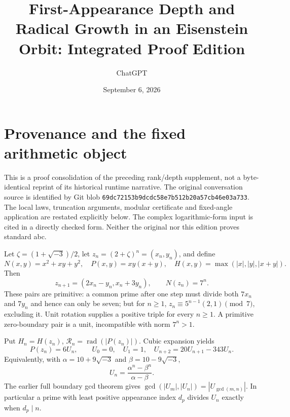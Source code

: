 \documentclass[11pt]{amsart}
\title{First-Appearance Depth and Radical Growth in an Eisenstein Orbit: Integrated Proof Edition}
\author{ChatGPT}\date{September 6, 2026}
\theoremstyle{definition}\newtheorem{definition}[theorem]{Definition}
\theoremstyle{remark}\newtheorem{remark}[theorem]{Remark}
\newcommand{\rad}{\operatorname{rad}}\newcommand{\eps}{\varepsilon}
\begin{document}
\maketitle
\section{Provenance and the fixed arithmetic object}
This is a proof consolidation of the preceding rank/depth supplement, not a byte-identical reprint of its historical runtime narrative. The original conversation source is identified by Git blob \texttt{69dc72153b9dcdc58e7b512b20a57cb46e03a733}. The local laws, truncation arguments, modular certificate and fixed-angle application are restated explicitly below. The complex logarithmic-form input is cited in a directly checked form. Neither the original nor this edition proves standard abc.

Let $\zeta=(1+\sqrt{-3})/2$, let $z_n=(2+\zeta)^n=(x_n,y_n)$, and define
\[
 N(x,y)=x^2+xy+y^2,\quad P(x,y)=xy(x+y),\quad H(x,y)=\max(|x|,|y|,|x+y|).
\]
Then
\[
 z_{n+1}=(2x_n-y_n,x_n+3y_n),\qquad N(z_n)=7^n.
\]
These pairs are primitive: a common prime after one step must divide both $7x_n$ and $7y_n$ and hence can only be seven; but for $n\ge1$, $z_n\equiv5^{n-1}(2,1)\pmod7$, excluding it. Unit rotation supplies a positive triple for every $n\ge1$. A primitive zero-boundary pair is a unit, incompatible with norm $7^n>1$.

Put $H_n=H(z_n)$, $\mathscr R_n=\rad(|P(z_n)|)$. Cubic expansion yields
\[
 P(z_n)=6U_n,\qquad U_0=0,\quad U_1=1,\quad U_{n+2}=20U_{n+1}-343U_n.
\]
Equivalently, with $\alpha=10+9\sqrt{-3}$ and $\beta=10-9\sqrt{-3}$,
\[
 U_n=\frac{\alpha^n-\beta^n}{\alpha-\beta}.
\]
The earlier full boundary gcd theorem gives $\gcd(|U_m|,|U_n|)=|U_{\gcd(m,n)}|$. In particular a prime with least positive appearance index $d_p$ divides $U_n$ exactly when $d_p\mid n$.
\end{document}

